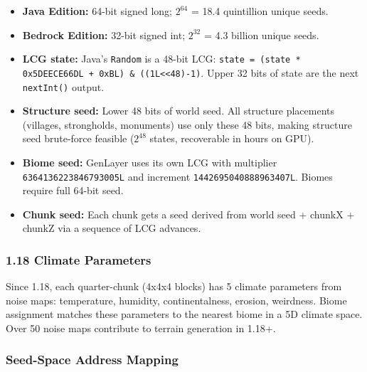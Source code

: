 \documentclass[11pt,letterpaper]{article}
\begin{document}
\begin{itemize}[leftmargin=2em]
  \item \textbf{Java Edition:} 64-bit signed long; $2^{64}$ = 18.4 quintillion unique seeds.
  \item \textbf{Bedrock Edition:} 32-bit signed int; $2^{32}$ = 4.3 billion unique seeds.
  \item \textbf{LCG state:} Java's \texttt{Random} is a 48-bit LCG: \texttt{state = (state * 0x5DEECE66DL + 0xBL) \& ((1L<<48)-1)}. Upper 32 bits of state are the next \texttt{nextInt()} output.
  \item \textbf{Structure seed:} Lower 48 bits of world seed. All structure placements (villages, strongholds, monuments) use only these 48 bits, making structure seed brute-force feasible ($2^{48}$ states, recoverable in hours on GPU).
  \item \textbf{Biome seed:} GenLayer uses its own LCG with multiplier \texttt{6364136223846793005L} and increment \texttt{1442695040888963407L}. Biomes require full 64-bit seed.
  \item \textbf{Chunk seed:} Each chunk gets a seed derived from world seed + chunkX + chunkZ via a sequence of LCG advances.
\end{itemize}

\subsubsection{1.18 Climate Parameters}

Since 1.18, each quarter-chunk (4x4x4 blocks) has 5 climate parameters from noise maps: temperature, humidity, continentalness, erosion, weirdness. Biome assignment matches these parameters to the nearest biome in a 5D climate space. Over 50 noise maps contribute to terrain generation in 1.18+.

\subsubsection{Seed-Space Address Mapping}
\end{document}
